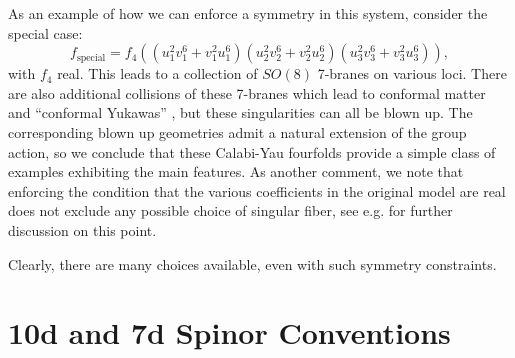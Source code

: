 \documentclass[12pt]{article}%
\numberwithin{equation}{section}
\renewcommand{\(}{\left(}
\renewcommand{\)}{\right)}
\renewcommand{\[}{\left[}
\renewcommand{\]}{\right]}
\begin{document}
As an example of how we can enforce a symmetry in this system, consider the
special case:%
\begin{equation}
f_{\text{special}}=f_{4}\left(  \left(  u_{1}^{2}v_{1}^{6}+v_{1}^{2}u_{1}%
^{6}\right)  \left(  u_{2}^{2}v_{2}^{6}+v_{2}^{2}u_{2}^{6}\right)  \left(
u_{3}^{2}v_{3}^{6}+v_{3}^{2}u_{3}^{6}\right)  \right)  ,
\end{equation}
with $f_{4}$ real. This leads to a collection of $SO(8)$ 7-branes on various
loci. There are also additional collisions of these 7-branes which lead to
conformal matter and \textquotedblleft conformal Yukawas\textquotedblright
\cite{DelZotto:2014hpa, Heckman:2014qba, Apruzzi:2018oge},
but these singularities can all be blown up. The
corresponding blown up geometries admit a natural extension of the group
action, so we conclude that these Calabi-Yau fourfolds provide a simple class
of examples exhibiting the main features. As another comment, we note that
enforcing the condition that the various coefficients in the original model
are real does not exclude any possible choice of singular fiber, see e.g.
\cite{Dierigl:2020wen} for further discussion on this point.

Clearly, there are many choices available, even with such symmetry
constraints.

\section{10d and 7d Spinor Conventions} \label{app:SPINOR}
\end{document}
